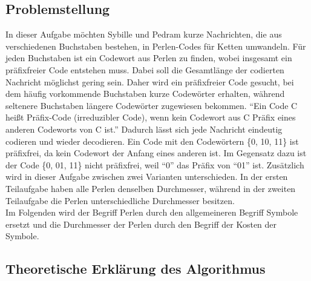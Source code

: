 \documentclass[a4paper,12pt,ngerman]{scrartcl}
\begin{document}
\subsection{Problemstellung}
In dieser Aufgabe möchten Sybille und Pedram kurze Nachrichten, die aus verschiedenen Buchstaben bestehen, in Perlen-Codes für Ketten umwandeln.
Für jeden Buchstaben ist ein Codewort aus Perlen zu finden, wobei insgesamt ein präfixfreier Code entstehen muss.
Dabei soll die Gesamtlänge der codierten Nachricht möglichst gering sein.\cite{bwinf_aufgabe}
Daher wird ein präfixfreier Code gesucht, bei dem häufig vorkommende Buchstaben kurze Codewörter erhalten, während seltenere Buchstaben längere Codewörter zugewiesen bekommen. 
\enquote{Ein Code C heißt Präfix-Code (irreduzibler Code), wenn kein Codewort aus C Präfix eines anderen Codeworts von C ist.}\cite[S. 37]{schulz2018codierungstheorie}
Dadurch lässt sich jede Nachricht eindeutig codieren und wieder decodieren.\cite[S. 37]{schulz2018codierungstheorie}
Ein Code mit den Codewörtern \{0, 10, 11\} ist präfixfrei, da kein Codewort der Anfang eines anderen ist.
Im Gegensatz dazu ist der Code \{0, 01, 11\} nicht präfixfrei, weil \enquote{0} das Präfix von \enquote{01} ist.
Zusätzlich wird in dieser Aufgabe zwischen zwei Varianten unterschieden.
In der ersten Teilaufgabe haben alle Perlen denselben Durchmesser, 
während in der zweiten Teilaufgabe die Perlen unterschiedliche Durchmesser besitzen.\cite{bwinf_aufgabe}\\
Im Folgenden wird der Begriff Perlen durch den allgemeineren Begriff Symbole ersetzt und die Durchmesser der Perlen durch den Begriff der Kosten der Symbole.
\subsection{Theoretische Erklärung des Algorithmus}
\end{document}
